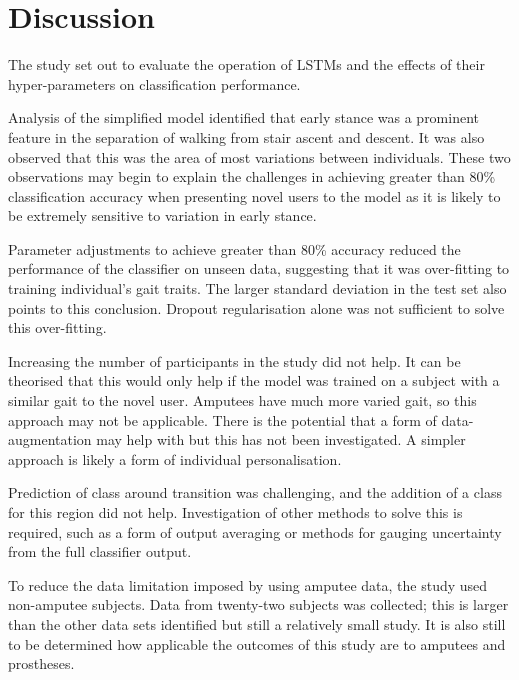 \documentclass[sensors,article,submit,moreauthors,pdftex]{Definitions/mdpi}
\begin{document}
\section{Discussion}
\label{sec:discussion}
The study set out to evaluate the operation of LSTMs and the effects of their hyper-parameters on classification performance.

Analysis of the simplified model identified that early stance was a prominent feature in the separation of walking from stair ascent and descent. It was also observed that this was the area of most variations between individuals. These two observations may begin to explain the challenges in achieving greater than 80\% classification accuracy when presenting novel users to the model as it is likely to be extremely sensitive to variation in early stance.  

Parameter adjustments to achieve greater than 80\% accuracy reduced the performance of the classifier on unseen data, suggesting that it was over-fitting to training individual's gait traits. The larger standard deviation in the test set also points to this conclusion. Dropout regularisation alone was not sufficient to solve this over-fitting.

Increasing the number of participants in the study did not help. It can be theorised that this would only help if the model was trained on a subject with a similar gait to the novel user. Amputees have much more varied gait, so this approach may not be applicable. There is the potential that a form of data-augmentation may help with but this has not been investigated. A simpler approach is likely a form of individual personalisation.

Prediction of class around transition was challenging, and the addition of a class for this region did not help. Investigation of other methods to solve this is required, such as a form of output averaging or methods for gauging uncertainty from the full classifier output.

To reduce the data limitation imposed by using amputee data, the study used non-amputee subjects. Data from twenty-two subjects was collected; this is larger than the other data sets identified but still a relatively small study. It is also still to be determined how applicable the outcomes of this study are to amputees and prostheses.

\end{document}
